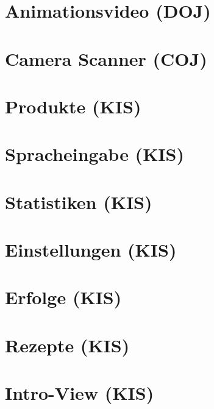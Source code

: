 \documentclass[
    headings=optiontotocandhead,%
    twoside,
    numbers=noenddot,%
    toc=flat, %
    12pt, %
    titlepage, %
    parskip=full, %
    listof=totoc, %
    listof=flat, %
    numbers=noenddot, %
    bibliography=totoc, %
    a4paper,DIV=14,
    BCOR=15mm,
]{scrbook}
\begin{document}
\chapter{Animationsvideo (DOJ)}
\renewcommand{\kapitelautor}{Autor: Rafael Doja}

\chapter{Camera Scanner (COJ)}
\renewcommand{\kapitelautor}{Autor: Filip Coja}


\chapter{Produkte (KIS)}
\renewcommand{\kapitelautor}{Autor: Daniel Kisling}


\chapter{Spracheingabe (KIS)}
\renewcommand{\kapitelautor}{Autor: Daniel Kisling}

\chapter{Statistiken (KIS)}
\renewcommand{\kapitelautor}{Autor: Daniel Kisling}


\chapter{Einstellungen (KIS)}
\renewcommand{\kapitelautor}{Autor: Daniel Kisling}


\chapter{Erfolge (KIS)}
\renewcommand{\kapitelautor}{Autor: Daniel Kisling}

\chapter{Rezepte (KIS)}
\renewcommand{\kapitelautor}{Autor: Daniel Kisling}

\chapter{Intro-View (KIS)}
\renewcommand{\kapitelautor}{Autor: Daniel Kisling}
\end{document}
